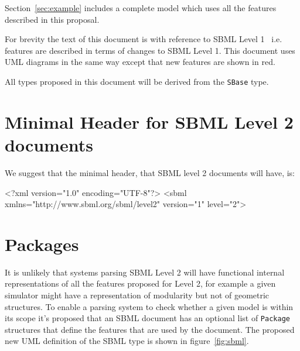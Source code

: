 \documentclass{cekarticle}
\begin{document}
Section~\ref{sec:example} includes a complete model which uses
all the features described in this proposal.

For brevity the text of this document is with reference to SBML
Level 1~\citep{hucka:2001} i.e. features are described in terms
of changes to SBML Level 1.  This document uses UML diagrams in
the same way except that new features are shown in red.

All types proposed in this document will be derived from the
\texttt{SBase} type.

\section{Minimal Header for SBML Level 2 documents}

We suggest that the minimal header, that SBML level 2 documents will have, is:

\begin{example}
<?xml version="1.0" encoding="UTF-8"?>
<sbml xmlns="http://www.sbml.org/sbml/level2" version="1" level="2">
\end{example}

\section{Packages}
\label{sec:features}

It is unlikely that systems parsing SBML Level 2 will have
functional internal representations of all the features proposed
for Level 2, for example a given simulator might have a
representation of modularity but not of geometric structures. To
enable a parsing system to check whether a given model is within
its scope it's proposed that an SBML document has an optional
list of \texttt{Package} structures that define the features that
are used by the document.  The proposed new UML definition of the SBML
type is shown in figure~\ref{fig:sbml}.
\end{document}
